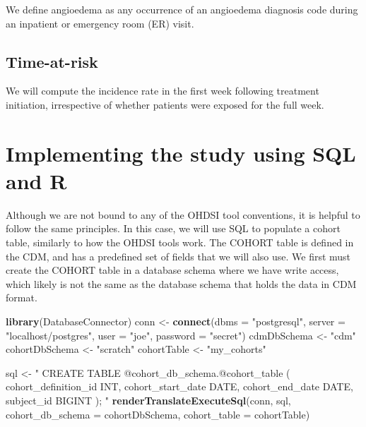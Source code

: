\documentclass[11pt]{book}
\newenvironment{Shaded}{\begin{snugshade}}{\end{snugshade}}
\newcommand{\DataTypeTok}[1]{\textcolor[rgb]{0.13,0.29,0.53}{#1}}
\newcommand{\KeywordTok}[1]{\textcolor[rgb]{0.13,0.29,0.53}{\textbf{#1}}}
\newcommand{\NormalTok}[1]{#1}
\newcommand{\StringTok}[1]{\textcolor[rgb]{0.31,0.60,0.02}{#1}}
\theoremstyle{definition}
\theoremstyle{definition}
\theoremstyle{definition}
\theoremstyle{remark}
\begin{document}
We define angioedema as any occurrence of an angioedema diagnosis code during an inpatient or emergency room (ER) visit.

\hypertarget{time-at-risk}{%
\subsection{Time-at-risk}\label{time-at-risk}}

We will compute the incidence rate in the first week following treatment initiation, irrespective of whether patients were exposed for the full week.

\hypertarget{implementing-the-study-using-sql-and-r}{%
\section{Implementing the study using SQL and R}\label{implementing-the-study-using-sql-and-r}}

Although we are not bound to any of the OHDSI tool conventions, it is helpful to follow the same principles. In this case, we will use SQL to populate a cohort table, similarly to how the OHDSI tools work. The COHORT table is defined in the CDM, and has a predefined set of fields that we will also use. We first must create the COHORT table in a database schema where we have write access, which likely is not the same as the database schema that holds the data in CDM format.

\begin{Shaded}
\begin{Highlighting}[]
\KeywordTok{library}\NormalTok{(DatabaseConnector)}
\NormalTok{conn <-}\StringTok{ }\KeywordTok{connect}\NormalTok{(}\DataTypeTok{dbms =} \StringTok{"postgresql"}\NormalTok{,}
                \DataTypeTok{server =} \StringTok{"localhost/postgres"}\NormalTok{,}
                \DataTypeTok{user =} \StringTok{"joe"}\NormalTok{,}
                \DataTypeTok{password =} \StringTok{"secret"}\NormalTok{)}
\NormalTok{cdmDbSchema <-}\StringTok{ "cdm"}
\NormalTok{cohortDbSchema <-}\StringTok{ "scratch"}
\NormalTok{cohortTable <-}\StringTok{ "my_cohorts"}

\NormalTok{sql <-}\StringTok{ "}
\StringTok{CREATE TABLE @cohort_db_schema.@cohort_table (}
\StringTok{  cohort_definition_id INT,}
\StringTok{  cohort_start_date DATE,}
\StringTok{  cohort_end_date DATE,}
\StringTok{  subject_id BIGINT}
\StringTok{);}
\StringTok{"}
\KeywordTok{renderTranslateExecuteSql}\NormalTok{(conn, sql,}
                          \DataTypeTok{cohort_db_schema =}\NormalTok{ cohortDbSchema,}
                          \DataTypeTok{cohort_table =}\NormalTok{ cohortTable)}
\end{Highlighting}
\end{Shaded}
\end{document}
